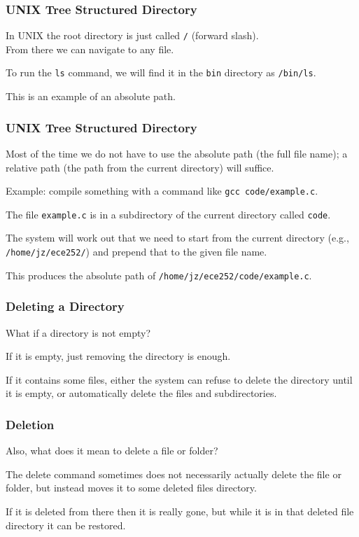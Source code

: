 \begin{frame}
\frametitle{UNIX Tree Structured Directory}

In UNIX the root directory is just called \texttt{/} (forward slash).\\
\quad From there we can navigate to any file. 

To run the \texttt{ls} command, we will find it in the \texttt{bin} directory as \texttt{/bin/ls}. 

This is an example of an absolute path.

\end{frame}

\begin{frame}
\frametitle{UNIX Tree Structured Directory}

Most of the time we do not have to use the absolute path (the full file name); a relative path (the path from the current directory) will suffice. 

Example: compile something with a command like \texttt{gcc code/example.c}.

The file \texttt{example.c} is in a subdirectory of the current directory called \texttt{code}.

The system will work out that we need to start from the current directory (e.g., \texttt{/home/jz/ece252/}) and prepend that to the given file name.

This produces the absolute path of \texttt{/home/jz/ece252/code/example.c}.

\end{frame}



\begin{frame}
\frametitle{Deleting a Directory}

What if a directory is not empty? 

If it is empty, just removing the directory is enough. 

If it contains some files, either the system can refuse to delete the directory until it is empty, or automatically delete the files and subdirectories. 

\end{frame}

\begin{frame}
\frametitle{Deletion}

Also, what does it mean to delete a file or folder? 

The delete command sometimes does not necessarily actually delete the file or folder, but instead moves it to some deleted files directory. 

If it is deleted from there then it is really gone, but while it is in that deleted file directory it can be restored.

\end{frame}

